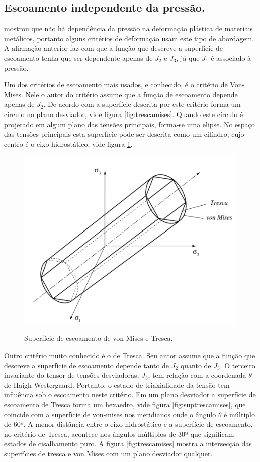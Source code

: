 \subsection{Escoamento independente da pressão.}

 \cite{hill} mostrou que não há dependência da pressão na deformação plástica de materiais metálicos, portanto alguns critérios de deformação usam este tipo de abordagem. A afirmação anterior faz com que a função que descreve a superfície de escoamento tenha que ser dependente apenas de $J_2$ e $J_3$, já que $J_1$ é associado à pressão.

Um dos critérios de escoamento mais usados, e conhecido, é o critério de Von-Mises. Nele o autor do critério assume que a função de escoamento depende apenas de $ J_2 $. De acordo com \cite{hiermaier_2008} a superfície descrita por este critério forma um círculo no plano desviador, vide figura \ref{fig:trescamises}. Quando este círculo é projetado em algum plano das tensões principais, forma-se uma elipse. No espaço das tensões principais esta superfície pode ser descrita como um cilíndro, cujo centro é o eixo hidrostático, vide figura \ref{fig:suptrescaemises}.

\begin{figure}[H]
    \centering
    \caption{Superfície de escoamento de  von Mises e Tresca.}
    \includegraphics[width=0.7\linewidth]{images/Sup_trescaemises.png} %
    \label{fig:suptrescaemises}
\end{figure}

Outro critério muito conhecido é o de Tresca. Seu autor assume que a função que descreve a superfície de escoamento depende tanto de $ J_2 $ quanto de $ J_3 $. O terceiro invariante do tensor de tensões desviadoras, $ J_3 $, tem relação com a coordenada $ \theta $ de Haigh-Westergaard. Portanto, o estado de triaxialidade da tensão tem influência sob o escoamento neste critério. Em um plano desviador a superfície de escoamento de Tresca forma um hexaedro, vide figura \ref{fig:suptrescamises}, que coincide com a superfície de von-mises nos meridianos onde o ângulo $ \theta $ é múltiplo de $ 60º $. A menor distância entre o eixo hidrostático e a superfície de escoamento, no critério de Tresca, acontece nos ângulos múltiplos de $ 30º $ que significam estados de cisalhamento puro. A figura \ref{fig:trescamises} mostra a intersecção das superfícies de tresca e von Mises com um plano desviador qualquer.


